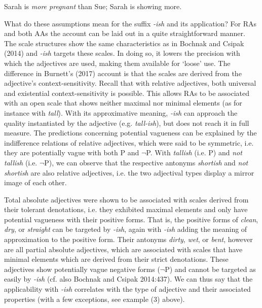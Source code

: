 \documentclass[output=paper
,modfonts
,nonflat]{langsci/langscibook}
\begin{document}
\begin{examples}
	\item Sarah is \textit{more pregnant} than Sue; Sarah is showing more.
\end{examples}

What do these assumptions mean for the suffix \textit{-ish} and its application? For RAs and both AAs the account can be laid out in a quite straightforward manner. The scale structures show the same characteristics as in Bochnak and Csipak (2014) and \textit{-ish} targets these scales. In doing so, it lowers the precision with which the adjectives are used, making them available for `loose' use. The difference in Burnett's (2017) account is that the scales are derived from the adjective's context-sensitivity. Recall that with relative adjectives, both universal and existential context-sensitivity is possible. This allows RAs to be associated with an open scale that shows neither maximal nor minimal elements (as for instance with \textit{tall}). With its approximative meaning, \textit{-ish} can approach the quality instantiated by the adjective (e.g. \textit{tall-ish}), but does not reach it in full measure. The predictions concerning potential vagueness can be explained by the indifference relations of relative adjectives, which were said to be symmetric, i.e. they are potentially vague with both P and $\neg$P. With \textit{tallish} (i.e. P) and \textit{not tallish} (i.e. $\neg$P), we can observe that the respective antonyms \textit{shortish} and \textit{not shortish} are also relative adjectives, i.e. the two adjectival types display a mirror image of each other.

Total absolute adjectives were shown to be associated with scales derived from their tolerant denotations, i.e. they exhibited maximal elements and only have potential vagueness with their positive forms. That is, the positive forms of \textit{clean}, \textit{dry}, or \textit{straight} can be targeted by \textit{-ish}, again with \textit{-ish} adding the meaning of approximation to the positive form. Their antonyms \textit{dirty}, \textit{wet}, or \textit{bent}, however are all partial absolute adjectives, which are associated with scales that have minimal elements which are derived from their strict denotations. These adjectives show potentially vague negative forms ($\neg$P) and cannot be targeted as easily by \textit{-ish} (cf. also Bochnak and Csipak 2014:437). We can thus say that the applicability with \textit{-ish} correlates with the type of adjective and their associated properties (with a few exceptions, see example (3) above).
\end{document}
